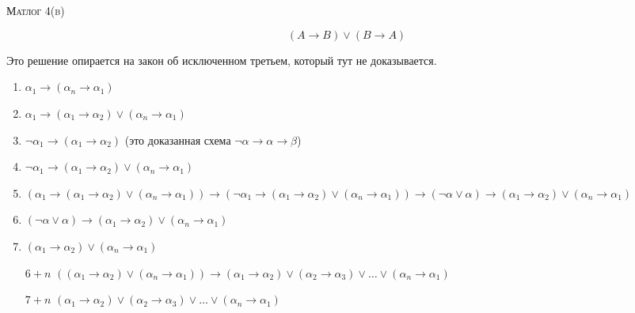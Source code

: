 \documentclass[10pt]{article}
\begin{document}
\def\chap#1#2{\ \\ {\large\bf#1 \ | \ \tt\scshape#2} \par}

\ \vspace{-1cm}

{\bf
\ \\
\Large\centerline{\scshape Матлог 4(b)}
}\normalsize

\[ (A \to B) \lor (B \to A)\]

Это решение опирается на закон об исключенном третьем, который тут не доказывается.
\begin{enumerate}
    \item $\alpha_1 \to (\alpha_n \to \alpha_1)$
    \item $\alpha_1 \to (\alpha_1 \to \alpha_2) \lor (\alpha_n \to \alpha_1)$
    \item $\neg \alpha_1 \to (\alpha_1 \to \alpha_2)$  (это доказанная схема $\neg \alpha \to \alpha \to \beta$)
    \item $\neg \alpha_1 \to (\alpha_1 \to \alpha_2) \lor (\alpha_n \to \alpha_1)$
    \item $(\alpha_1 \to (\alpha_1 \to \alpha_2) \lor (\alpha_n \to \alpha_1)) \to (\neg \alpha_1 \to (\alpha_1 \to \alpha_2) \lor (\alpha_n \to \alpha_1)) \to (\neg \alpha \lor \alpha) \to (\alpha_1 \to \alpha_2) \lor (\alpha_n \to \alpha_1)$
    \item $(\neg \alpha \lor \alpha) \to (\alpha_1 \to \alpha_2) \lor (\alpha_n \to \alpha_1)$
    \item $(\alpha_1 \to \alpha_2) \lor (\alpha_n \to \alpha_1)$
    \item[$6+n$] $((\alpha_1 \to \alpha_2) \lor (\alpha_n \to \alpha_1)) \to (\alpha_1 \to \alpha_2) \lor (\alpha_2 \to \alpha_3) \lor \ldots \lor (\alpha_n \to \alpha_1)$ 
    \item[$7+n$] $(\alpha_1 \to \alpha_2) \lor (\alpha_2 \to \alpha_3) \lor \ldots \lor (\alpha_n \to \alpha_1)$
\end{enumerate}
\end{document}
